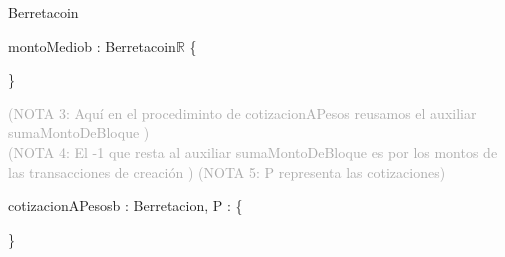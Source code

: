 \documentclass[10pt,a4paper]{article}
\begin{document}
\begin{tad}{Berretacoin}{}
\begin{proc}{montoMedio}{\In b : Berretacoin}{\ensuremath{\mathds{R}} \{ }
		
		
		
		
	\end{proc}
	\}
	
		\textcolor{darkgray}{(\textsc{NOTA 3}: Aquí en el procediminto de cotizacionAPesos reusamos el auxiliar sumaMontoDeBloque )} \\
		\textcolor{darkgray}{(\textsc{NOTA 4}: El -1 que resta al auxiliar sumaMontoDeBloque es por los montos de las transacciones de creación )} 
		\textcolor{darkgray}{(\textsc{NOTA 5}: P representa las cotizaciones)} 
	
	\begin{proc}{cotizacionAPesos}{\In b : Berretacion, \In P : \TLista{\ent}}{\TLista{\ent} \{ } 
	\end{proc}
	\}
	
\end{tad}
 
\end{document}

